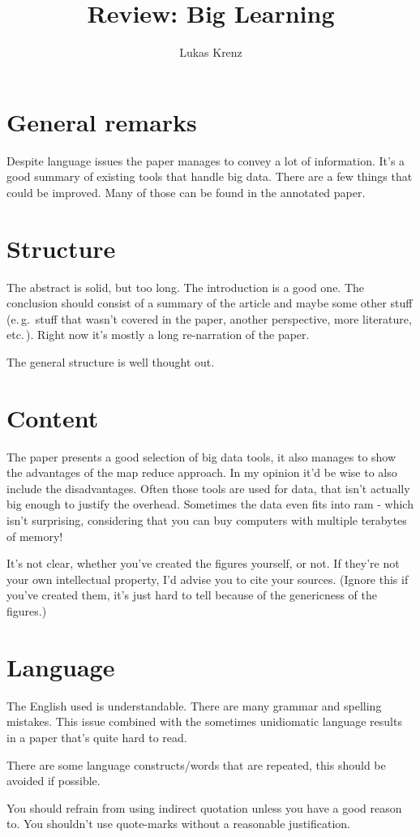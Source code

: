 \documentclass{article}
\begin{document}
\title{Review: Big Learning}
\author{Lukas Krenz}

\maketitle

\section{General remarks}
Despite language issues the paper manages to convey a lot of information. It's a good summary of existing tools that handle big data. There are a few things that could be improved. Many of those can be found in the annotated paper.

\section{Structure}
The abstract is solid, but too long. 
The introduction is a good one.
The conclusion should consist of a summary of the article and maybe some other stuff (e.\,g.~stuff that wasn't covered in the paper, another perspective, more literature, etc.\,). Right now it's mostly a long re-narration of the paper.

The general structure is well thought out. 

\section{Content}
The paper presents a good selection of big data tools, it also manages to show the advantages of the map reduce approach. In my opinion it'd be wise to also include the disadvantages. Often those tools are used for data, that isn't actually big enough to justify the overhead. Sometimes the data even fits into ram - which isn't surprising, considering that you can buy computers with multiple terabytes of memory!

It's not clear, whether you've created the figures yourself, or not. If they're not your own intellectual property, I'd advise you to cite your sources. (Ignore this if you've created them, it's just hard to tell because of the genericness of the figures.)

\section{Language}
The English used is understandable. There are many grammar and spelling mistakes. This issue combined with the sometimes unidiomatic language results in a paper that's quite hard to read.

There are some language constructs/words that are repeated, this should be avoided if possible. 

You should refrain from using indirect quotation unless you have a good reason to. You shouldn't use quote-marks without a reasonable justification. 
\end{document}
